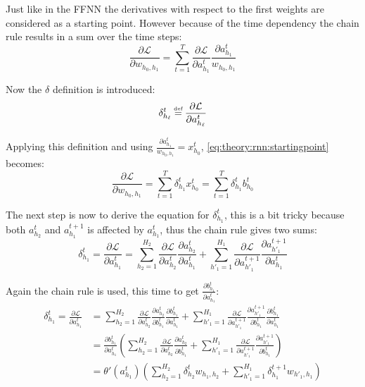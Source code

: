Just like in the FFNN the derivatives with respect to the first weights are considered as a starting point. However because of the time dependency the chain rule results in a sum over the time steps:
\begin{equation}
\frac{\partial \mathcal{L}}{\partial w_{h_0, h_1}} = \sum_{t=1}^T \frac{\partial \mathcal{L}}{\partial a_{h_1}^t} \frac{\partial a_{h_1}^t}{w_{h_0, h_1}}
\label{eq:theory:rnn:startingpoint}
\end{equation}

Now the $\delta$ definition is introduced:
\begin{equation}
\delta_{h_\ell}^t \defeq \frac{\partial \mathcal{L}}{\partial a_{h_\ell}^t}
\end{equation}

Applying this definition and using $ \frac{\partial a_{h_1}^t}{w_{h_0, h_1}} = x_{h_0}^t$,  \eqref{eq:theory:rnn:startingpoint} becomes:
\begin{equation}
\frac{\partial \mathcal{L}}{\partial w_{h_0, h_1}} = \sum_{t=1}^T \delta_{h_1}^t x_{h_0}^t = \sum_{t=1}^T \delta_{h_1}^t b_{h_0}^t 
\end{equation}

The next step is now to derive the equation for $\delta_{h_1}^t$, this is a bit tricky because both $a_{h_2}^t$ and $a_{h_1}^{t+1}$ is affected by $a_{h_1}^t$, thus the chain rule gives two sums:
\begin{equation}
\delta_{h_1}^t = \frac{\partial \mathcal{L}}{\partial a_{h_1}^t}
= \sum_{h_2 = 1}^{H_2} \frac{\partial \mathcal{L}}{\partial a_{h_2}^t} \frac{\partial a_{h_2}^t}{\partial a_{h_1}^t}
+ \sum_{h'_1 = 1}^{H_1} \frac{\partial \mathcal{L}}{\partial a_{h'_1}^{t+1}} \frac{\partial a_{h'_1}^{t+1}}{\partial a_{h_1}^t}
\end{equation}

Again the chain rule is used, this time to get $\frac{\partial b_{h_1}^t}{\partial a_{h_1}^t}$:
\begin{equation}
\begin{aligned}
\delta_{h_1}^t = \frac{\partial \mathcal{L}}{\partial a_{h_1}^t}
&= \sum_{h_2 = 1}^{H_2} \frac{\partial \mathcal{L}}{\partial a_{h_2}^t} \frac{\partial a_{h_2}^t}{\partial b_{h_1}^t} \frac{\partial b_{h_1}^t}{\partial a_{h_1}^t}
+ \sum_{h'_1 = 1}^{H_1} \frac{\partial \mathcal{L}}{\partial a_{h'_1}^{t+1}} \frac{\partial a_{h'_1}^{t+1}}{\partial b_{h_1}^t} \frac{\partial b_{h_1}^t}{\partial a_{h_1}^t} \\
&= \frac{\partial b_{h_1}^t}{\partial a_{h_1}^t} \left(\sum_{h_2 = 1}^{H_2} \frac{\partial \mathcal{L}}{\partial a_{h_2}^t} \frac{\partial a_{h_2}^t}{\partial b_{h_1}^t}
+ \sum_{h'_1 = 1}^{H_1} \frac{\partial \mathcal{L}}{\partial a_{h'_1}^{t+1}} \frac{\partial a_{h'_1}^{t+1}}{\partial b_{h_1}^t} \right) \\
&= \theta'(a_{h_1}^t) \left( \sum_{h_2=1}^{H_2} \delta_{h_2}^t w_{h_1, h_2}
+ \sum_{h'_1=1}^{H_1} \delta_{h_1}^{t+1} w_{h'_1, h_1} \right)
\label{eq:theory:rnn:bprop-delta1}
\end{aligned}
\end{equation}

